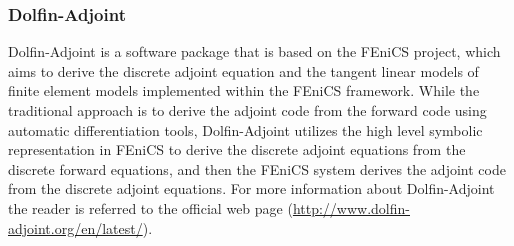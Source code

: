   

\subsubsection{Dolfin-Adjoint}

Dolfin-Adjoint \cite{farrell2013automated} is a software package that
is based on the FEniCS project,
which aims to derive the discrete adjoint equation and the tangent
linear models of finite element models implemented within the FEniCS
framework. While the traditional approach is to derive the adjoint code
from the forward code using automatic differentiation tools,
Dolfin-Adjoint utilizes the high level symbolic representation
\cite{alnaes2014unified} in FEniCS to derive the discrete adjoint
equations from the discrete forward equations, and then the FEniCS
system derives the adjoint code from the discrete adjoint equations. 
For more information about Dolfin-Adjoint the reader is referred to
the official web page (\url{http://www.dolfin-adjoint.org/en/latest/}).

